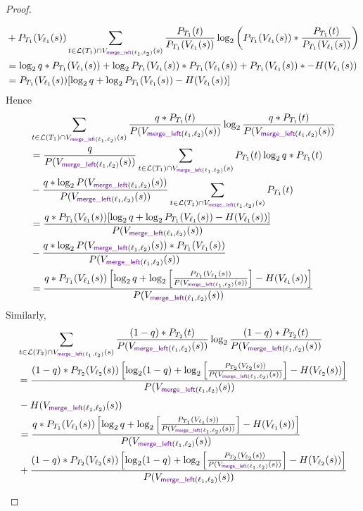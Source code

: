 \documentclass[acmsmall,screen,anonymous]{acmart}
\begin{document}
\begin{proof}
\begin{enumerate}
\begin{align*}
& + P_{T_1}(V_{\ell_1}(s))\sum_{t \in \mathcal{L}(T_1) \cap V_{ \MergeLOf{\Lens_1}{\Lens_2}}(s)}\frac{P_{T_1}(t)}{P_{T_1}(V_{\ell_1}(s))} \log_2 \left( P_{T_1}(V_{\ell_1}(s)) *  \frac{P_{T_1}(t)}{P_{T_1}(V_{\ell_1}(s))} \right)\\
&= \log_2 q * P_{T_1}(V_{\ell_1}(s)) + \log_2 P_{T_1}(V_{\ell_1}(s)) * P_{T_1}(V_{\ell_1}(s)) + P_{T_1}(V_{\ell_1}(s))* -H(V_{\ell_1}(s))\\
&= P_{T_1}(V_{\ell_1}(s))[\log_2 q + \log_2 P_{T_1}(V_{\ell_1}(s)) - H(V_{\ell_1}(s))]
\end{align*}
Hence
\begin{align*}
&\sum_{t \in \mathcal{L}(T_1) \cap V_{ \MergeLOf{\Lens_1}{\Lens_2}}(s)}\frac{q * P_{T_1}(t)}{P(V_{ \MergeLOf{\Lens_1}{\Lens_2}}(s))} \log_2 \frac{q * P_{T_1}(t)}{P(V_{ \MergeLOf{\Lens_1}{\Lens_2}}(s))} \\
&= \frac{q}{P(V_{ \MergeLOf{\Lens_1}{\Lens_2}}(s))}\sum_{t \in \mathcal{L}(T_1) \cap V_{ \MergeLOf{\Lens_1}{\Lens_2}}(s)}P_{T_1}(t) \log_2 q * P_{T_1}(t)\\
&- \frac{q * \log_2 P(V_{ \MergeLOf{\Lens_1}{\Lens_2}}(s))}{P(V_{ \MergeLOf{\Lens_1}{\Lens_2}}(s))}\sum_{t \in \mathcal{L}(T_1) \cap V_{ \MergeLOf{\Lens_1}{\Lens_2}}(s)}P_{T_1}(t)\\
&= \frac{q * P_{T_1}(V_{\ell_1}(s))[\log_2 q + \log_2 P_{T_1}(V_{\ell_1}(s)) - H(V_{\ell_1}(s))]}{P(V_{ \MergeLOf{\Lens_1}{\Lens_2}}(s))}\\
&- \frac{q * \log_2 P(V_{ \MergeLOf{\Lens_1}{\Lens_2}}(s)) * P_{T_1}(V_{\ell_1}(s))}{P(V_{ \MergeLOf{\Lens_1}{\Lens_2}}(s))}\\
&= \frac{q * P_{T_1}(V_{\ell_1}(s)) \left[\log_2 q + \log_2 \left[\frac{P_{T_1}(V_{\ell_1}(s))}{P(V_{ \MergeLOf{\Lens_1}{\Lens_2}}(s))}\right]  -H(V_{\ell_1}(s)) \right] }{P(V_{ \MergeLOf{\Lens_1}{\Lens_2}}(s))}
\end{align*}
Similarly,
\begin{align*}
&\sum_{t \in \mathcal{L}(T_2) \cap V_{ \MergeLOf{\Lens_1}{\Lens_2}}(s)}\frac{(1-q) * P_{T_2}(t)}{P(V_{ \MergeLOf{\Lens_1}{\Lens_2}}(s))} \log_2 \frac{(1-q) * P_{T_2}(t)}{P(V_{ \MergeLOf{\Lens_1}{\Lens_2}}(s))}\\
&= \frac{(1-q) * P_{T_2}(V_{\ell_2}(s)) \left[\log_2 (1-q) + \log_2 \left[\frac{P_{T_2}(V_{\ell_2}(s))}{P(V_{ \MergeLOf{\Lens_1}{\Lens_2}}(s))}\right] - H(V_{\ell_2}(s)) \right] }{P(V_{ \MergeLOf{\Lens_1}{\Lens_2}}(s))}
\end{align*}
\begin{align*}
&-H(V_{ \MergeLOf{\Lens_1}{\Lens_2}}(s))\\
&= \frac{q * P_{T_1}(V_{\ell_1}(s)) \left[\log_2 q + \log_2 \left[\frac{P_{T_1}(V_{\ell_1}(s))}{P(V_{ \MergeLOf{\Lens_1}{\Lens_2}}(s))}\right] - H(V_{\ell_1}(s)) \right] }{P(V_{ \MergeLOf{\Lens_1}{\Lens_2}}(s))}\\
&+ \frac{(1-q) * P_{T_2}(V_{\ell_2}(s)) \left[\log_2 (1-q) + \log_2 \left[\frac{P_{T_2}(V_{\ell_2}(s))}{P(V_{ \MergeLOf{\Lens_1}{\Lens_2}}(s))}\right] - H(V_{\ell_2}(s)) \right] }{P(V_{ \MergeLOf{\Lens_1}{\Lens_2}}(s))}
\end{align*}
\end{enumerate}

\end{proof}
\end{document}
